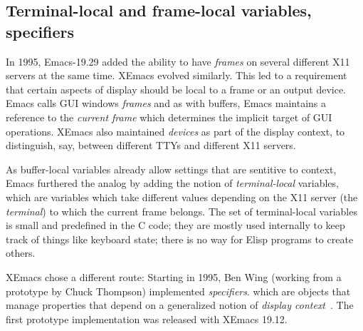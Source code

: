 \documentclass[format=acmsmall, review=false, screen=true]{acmart}
\newcommand \Elisp {Elisp}
\begin{document}









\subsection{Terminal-local and frame-local variables, specifiers}

In 1995, Emacs-19.29 added the ability to have \emph{frames} on
several different X11 servers at the same time.  XEmacs evolved
similarly.  This led to a requirement that certain aspects of display
should be local to a frame or an output device.  Emacs calls GUI
windows \emph{frames} and as with buffers, Emacs maintains a reference
to the \emph{current frame} which determines the implicit target of
GUI operations.  XEmacs also maintained \textit{devices} as part of
the display context, to distinguish, say, between different TTYs and
different X11 servers.

As buffer-local variables already allow settings that are sentitive to
context, Emacs furthered the analog by adding the notion of
\emph{terminal-local} variables, which are variables which take
different values depending on the X11 server (the \emph{terminal}) to
which the current frame belongs.  The set of terminal-local variables
is small and predefined in the C code; they are mostly used internally
to keep track of things like keyboard state; there is no way for
\Elisp{} programs to create others.

XEmacs chose a different route: Starting in 1995, Ben Wing (working
from a prototype by Chuck Thompson) implemented
\textit{specifiers}. which are objects that manage properties that
depend on a generalized notion of \textit{display
  context}~\cite{XEmacsLispRef1998}.  The first prototype
implementation was released with XEmacs 19.12.
\end{document}
